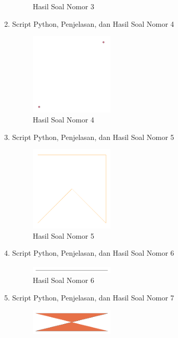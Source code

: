 \begin{enumerate}
\begin{figure}[H]
		\centering
		\caption{Hasil Soal Nomor 3}
	\end{figure}
	\item Script Python, Penjelasan, dan Hasil Soal Nomor 4
	
	\begin{figure}[H]
		\includegraphics[width=4cm]{figures/1174006/2/4.png}
		\centering
		\caption{Hasil Soal Nomor 4}
	\end{figure}
	\item Script Python, Penjelasan, dan Hasil Soal Nomor 5
	
	\begin{figure}[H]
		\includegraphics[width=4cm]{figures/1174006/2/5.png}
		\centering
		\caption{Hasil Soal Nomor 5}
	\end{figure}
	\item Script Python, Penjelasan, dan Hasil Soal Nomor 6
	
	\begin{figure}[H]
		\includegraphics[width=4cm]{figures/1174006/2/6.png}
		\centering
		\caption{Hasil Soal Nomor 6}
	\end{figure}
	\item Script Python, Penjelasan, dan Hasil Soal Nomor 7
	
	\begin{figure}[H]
		\includegraphics[width=4cm]{figures/1174006/2/7.png}

\end{figure}
\end{enumerate}
